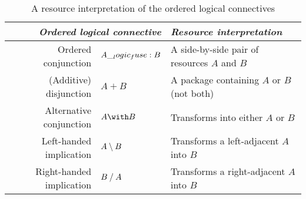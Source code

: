 \begin{table}[tbp]
  \centering
  \begin{tabular}{@{}rll@{}}
    \toprule
    \multicolumn{2}{r}{\emph{Ordered logical connective}} %
      & \emph{Resource interpretation}
    \\ \midrule
    Ordered conjunction & $A \__logic_fuse: B$ & A side-by-side pair of resources $A$ and $B$ %
    \\
    (Additive) disjunction & $A \plus B$ & %
      A package containing  $A$ or $B$ (not both)
    \\
    Alternative conjunction & $A \with B$ &%
      Transforms into either $A$ or $B$
    \\
    Left-handed implication & $A \mathbin { \setminus } B$ & %
      Transforms a left-adjacent %
      $A$ into %
      $B$ \\
    Right-handed implication & $B \mathbin { / } A$ & %
      Transforms a right-adjacent %
      $A$ into %
      $B$ \\
    \bottomrule
  \end{tabular}
  \caption{A resource interpretation of the ordered logical connectives}\label{tbl:ordered-logic:resources}
\end{table}

